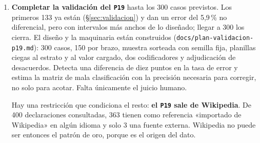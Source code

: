 \documentclass[11pt,a4paper]{article}
\begin{document}
\begin{enumerate}[leftmargin=1.6em,itemsep=0.25em]
  \item \textbf{Completar la validación del \texttt{P19}} hasta los 300 casos
    previstos. Los primeros 133 ya están (§\ref{sec:validacion}) y dan un error
    del 5,9\,\% no diferencial, pero con intervalos más anchos de lo diseñado;
    llegar a 300 los cierra. El diseño y la maquinaria están construidos
    (\texttt{docs/plan-valida\-cion-p19.md}): 300 casos, 150 por brazo, muestra
    sorteada con semilla fija, planillas ciegas al estrato y al valor cargado, dos
    codificadores y adjudicación de desacuerdos. Detecta una diferencia de diez
    puntos en la tasa de error y estima la matriz de mala clasificación con la
    precisión necesaria para corregir, no solo para acotar. Falta únicamente el
    juicio humano.

    Hay una restricción que condiciona el resto: \textbf{el \texttt{P19} sale de
    Wikipedia}. De 400 declaraciones consultadas, 363 tienen como referencia
    «importado de Wikipedia» en algún idioma y solo 3 una fuente externa. Wikipedia
    no puede ser entonces el patrón de oro, porque es el origen del dato.


\end{enumerate}
\end{document}
